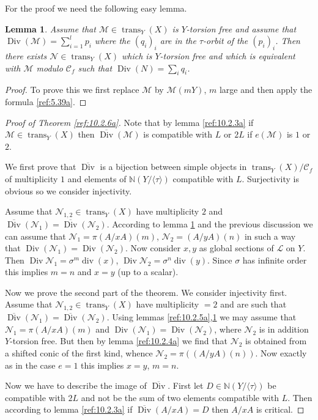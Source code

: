 \documentclass{amsproc}
\def \NN{{\mathbb N}}
\def\Cscr{{\mathcal C}}
\def\Lscr{{\mathcal L}}
\def\Mscr{{\mathcal M}}
\def\Nscr{{\mathcal N}}
\def\trans{\operatorname{trans}}
\def\Div{\operatorname{Div}}
\newtheorem{lemmas}{Lemma}[subsection]
\theoremstyle{definition}
\theoremstyle{remark}
\numberwithin{equation}{section}
\numberwithin{table}{section}
\numberwithin{figure}{section}
\begin{document}
For the proof we need the following easy lemma.
\begin{lemmas} 
\label{ref:10.2.7a}
Assume that $\Mscr\in \trans_Y(X)$ is $Y$-torsion free and assume that
$\Div(\Mscr)=\sum^l_{i=1} p_i$ where the $(q_i)_i$ are in the
$\tau$-orbit of the $(p_i)_i$. Then there exists $\Nscr\in
\trans_Y(X)$ which is $Y$-torsion free and which is equivalent with
$\Mscr$ modulo $\Cscr_f$ such that $\Div(N)=\sum_i q_i$.
\end{lemmas}
\begin{proof} To prove this we first replace $\Mscr$ by $\Mscr(mY)$,
  $m$ large and then apply the formula \eqref{ref:5.39a}.
\end{proof}
\begin{proof}[Proof of Theorem \ref{ref:10.2.6a}] 
  Note that by lemma \ref{ref:10.2.3a} if $\Mscr\in \trans_Y(X)$ then
  $\overline{\Div}(\Mscr)$ is compatible with $L$ or $2L$ if
  $e(\Mscr)$ is $1$ or $2$.


We first prove that
  $\overline{\Div}$ is a bijection between
simple objects in $\trans_Y(X)/\Cscr_f$ of multiplicity $1$ and
  elements of $\NN(Y/\langle \tau\rangle)$ compatible with
  $L$. Surjectivity is obvious so we consider injectivity.

Assume that
  $\Nscr_{1,2}\in \trans_Y(X)$
  have multiplicity $2$ and  $\overline{\Div}(
  \Nscr_1)=\overline{\Div}(\Nscr_2)$. According to lemma
  \ref{ref:10.2.7a} and the previous discussion we can assume that 
  $\Nscr_1=\pi (A/xA)(m)$, $\Nscr_2=(A/yA)(n)$ in such a way that
  $\Div(\Nscr_1)=\Div(\Nscr_2)$. Now consider $x,y$ as global sections
  of $\Lscr$ on $Y$. Then $\Div \Nscr_1=\sigma^m\operatorname{div}(x)$, $\Div
  \Nscr_2=\sigma^n \operatorname{div}(y)$. Since $\sigma$ has infinite order this
  implies $m=n$ and $x=y$ (up to a scalar).
  
Now we prove the second part of the theorem.
   We consider injectivity first. Assume that $\Nscr_{1,2}\in
  \trans_Y(X)$ have multiplicity $=2$ and are such that
  $\overline{\Div}(\Nscr_1)=\overline{\Div}(\Nscr_2)$. Using lemmas
  \ref{ref:10.2.5a},\ref{ref:10.2.7a} 
we may assume that $\Nscr_1=\pi(A/xA)(m)$ and
  $\Div(\Nscr_1)=\Div(\Nscr_2)$, where $\Nscr_2$ is in addition
   $Y$-torsion free. But then by lemma
  \ref{ref:10.2.4a} we find that $\Nscr_2$ is obtained from a
  shifted conic of the first kind, whence
  $\Nscr_2=\pi((A/yA)(n))$. Now exactly as in the case $e=1$ this
  implies $x=y$, $m=n$.
  
Now we have to describe the image of $\overline{\Div}$. 
First let
$D\in \NN(Y/\langle\tau\rangle)$ be compatible with $2L$ and not be
the sum of two elements compatible with $L$. Then according to lemma
\ref{ref:10.2.3a} if $\overline{\Div}(A/xA)=D$ then $A/xA$ is
critical.


\end{proof}
\end{document}
